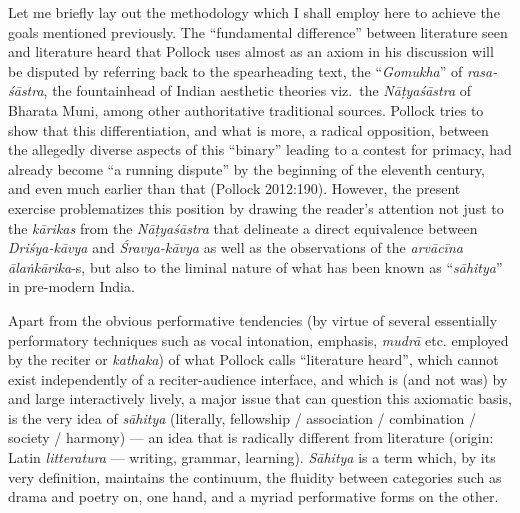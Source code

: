 Let me briefly lay out the methodology which I shall employ here to achieve the goals mentioned previously. The “fundamental difference” between literature seen and literature heard that Pollock uses almost as an axiom in his discussion will be disputed by referring back to the spearheading text, the “\textsl{Gomukha}” of \textsl{rasa-śāstra}, the fountainhead of Indian aesthetic theories viz.~the \textsl{Nāṭyaśāstra} of Bharata Muni, among other authoritative traditional sources. Pollock tries to show that this differentiation, and what is more, a radical opposition, between the allegedly diverse aspects of this “binary” leading to a contest for primacy, had already become “a running dispute” by the beginning of the eleventh century, and even much earlier than that (Pollock 2012:190). However, the present exercise problematizes this position by drawing the reader’s attention not just to the \textsl{kārikas} from the \textsl{Nāṭyaśāstra} that delineate a direct equivalence between \textsl{Driśya-kāvya} and \textsl{Śravya-kāvya} as well as the observations of the \textsl{arvācīna ālaṅkārika}-s, but also to the liminal nature of what has been known as “\textsl{sāhitya}” in pre-modern India.

Apart from the obvious performative tendencies (by virtue of several essentially performatory techniques such as vocal intonation, emphasis, \textsl{mudrā} etc. employed by the reciter or \textsl{kathaka}) of what Pollock calls “literature heard”, which cannot exist independently of a reciter-audience interface, and which is (and not was) by and large interactively lively, a major issue that can question this axiomatic basis, is the very idea of \textsl{sāhitya} (literally, fellowship / association / combination / society / harmony) --- an idea that is radically different from literature (origin: Latin \textsl{litteratura} --- writing, grammar, learning). \textsl{Sāhitya} is a term which, by its very definition, maintains the continuum, the fluidity between categories such as drama and poetry on, one hand, and a myriad performative forms on the other. 

